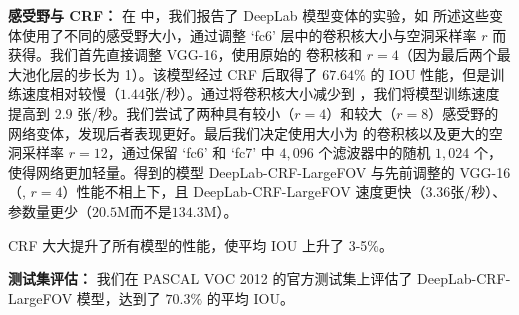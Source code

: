 \begin{table}[!t]
  \centering
  \addtolength{\tabcolsep}{2.5pt}
  \caption{通过调整 `fc6' 的卷积核大小和采样率 $r$ 达到的不同效果。我们在 CRF 计算前后显示了模型的参数量、训练速度（张/秒）和验证集上的平均 IOU。DeepLab-LargeFOV（卷积核，$r=12$）达到了最佳平衡。}
  \label{tab:fov}
\end{table}


\textbf{感受野与 CRF：} 在  中，我们报告了 DeepLab 模型变体的实验，如  所述这些变体使用了不同的感受野大小，通过调整 `fc6' 层中的卷积核大小与空洞采样率 $r$ 而获得。我们首先直接调整 VGG-16，使用原始的  卷积核和 $r=4$（因为最后两个最大池化层的步长为 1）。该模型经过 CRF 后取得了 $67.64\%$ 的 IOU 性能，但是训练速度相对较慢（$1.44$张/秒）。通过将卷积核大小减少到 ，我们将模型训练速度提高到 $2.9$ 张/秒。我们尝试了两种具有较小（$r=4$）和较大（$r=8$）感受野的网络变体，发现后者表现更好。最后我们决定使用大小为  的卷积核以及更大的空洞采样率 $r=12$，通过保留 `fc6' 和 `fc7' 中 $4,096$ 个滤波器中的随机 $1,024$ 个，使得网络更加轻量。得到的模型 DeepLab-CRF-LargeFOV 与先前调整的 VGG-16（, $r=4$）性能不相上下，且 DeepLab-CRF-LargeFOV 速度更快（$3.36$张/秒）、参数量更少（$20.5$M而不是$134.3$M）。

CRF 大大提升了所有模型的性能，使平均 IOU 上升了 3-5\%。

\textbf{测试集评估：} 我们在 PASCAL VOC 2012 的官方测试集上评估了 DeepLab-CRF-LargeFOV 模型，达到了 $70.3\%$ 的平均 IOU。

